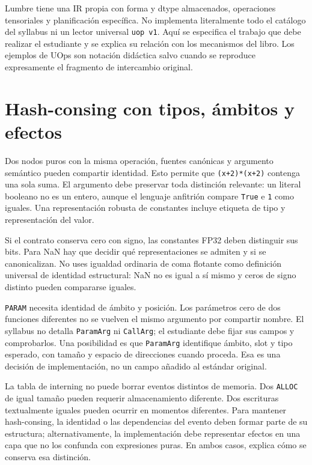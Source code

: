 \documentclass[12pt,a4paper,oneside]{report}
\begin{document}
Lumbre tiene una IR propia con forma y dtype almacenados, operaciones tensoriales y planificación específica. No implementa literalmente todo el catálogo del syllabus ni un lector universal \texttt{uop v1}. Aquí se especifica el trabajo que debe realizar el estudiante y se explica su relación con los mecanismos del libro. Los ejemplos de UOps son notación didáctica salvo cuando se reproduce expresamente el fragmento de intercambio original.

\section{Hash-consing con tipos, ámbitos y efectos}
Dos nodos puros con la misma operación, fuentes canónicas y argumento semántico pueden compartir identidad. Esto permite que \texttt{(x+2)*(x+2)} contenga una sola suma. El argumento debe preservar toda distinción relevante: un literal booleano no es un entero, aunque el lenguaje anfitrión compare \texttt{True} e \texttt{1} como iguales. Una representación robusta de constantes incluye etiqueta de tipo y representación del valor.

Si el contrato conserva cero con signo, las constantes FP32 deben distinguir sus bits. Para NaN hay que decidir qué representaciones se admiten y si se canonicalizan. No uses igualdad ordinaria de coma flotante como definición universal de identidad estructural: NaN no es igual a sí mismo y ceros de signo distinto pueden compararse iguales.

\texttt{PARAM} necesita identidad de ámbito y posición. Los parámetros cero de dos funciones diferentes no se vuelven el mismo argumento por compartir nombre. El syllabus no detalla \texttt{ParamArg} ni \texttt{CallArg}; el estudiante debe fijar sus campos y comprobarlos. Una posibilidad es que \texttt{ParamArg} identifique ámbito, slot y tipo esperado, con tamaño y espacio de direcciones cuando proceda. Esa es una decisión de implementación, no un campo añadido al estándar original.

La tabla de interning no puede borrar eventos distintos de memoria. Dos \texttt{ALLOC} de igual tamaño pueden requerir almacenamiento diferente. Dos escrituras textualmente iguales pueden ocurrir en momentos diferentes. Para mantener hash-consing, la identidad o las dependencias del evento deben formar parte de su estructura; alternativamente, la implementación debe representar efectos en una capa que no los confunda con expresiones puras. En ambos casos, explica cómo se conserva esa distinción.
\end{document}
